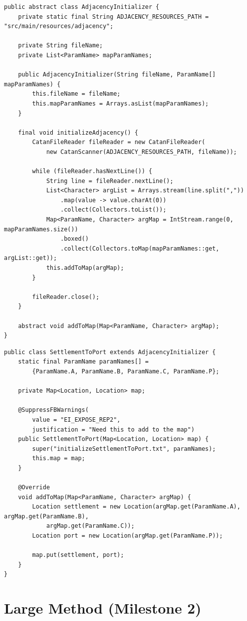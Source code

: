 \documentclass{fank1basedocument}
\begin{document}
\begin{lstlisting}[style=javacode,language=myJava]
public abstract class AdjacencyInitializer {
	private static final String ADJACENCY_RESOURCES_PATH = "src/main/resources/adjacency";

	private String fileName;
	private List<ParamName> mapParamNames;

	public AdjacencyInitializer(String fileName, ParamName[] mapParamNames) {
		this.fileName = fileName;
		this.mapParamNames = Arrays.asList(mapParamNames);
	}

	final void initializeAdjacency() {
		CatanFileReader fileReader = new CatanFileReader(
			new CatanScanner(ADJACENCY_RESOURCES_PATH, fileName));
		
		while (fileReader.hasNextLine()) {
			String line = fileReader.nextLine();
			List<Character> argList = Arrays.stream(line.split(","))
				.map(value -> value.charAt(0))
				.collect(Collectors.toList());
			Map<ParamName, Character> argMap = IntStream.range(0, mapParamNames.size())
				.boxed()
				.collect(Collectors.toMap(mapParamNames::get, argList::get));
			this.addToMap(argMap);
		}

		fileReader.close();
	}

	abstract void addToMap(Map<ParamName, Character> argMap);
}
\end{lstlisting}
\begin{lstlisting}[style=javacode,language=myJava]
public class SettlementToPort extends AdjacencyInitializer {
	static final ParamName paramNames[] =
		{ParamName.A, ParamName.B, ParamName.C, ParamName.P};

	private Map<Location, Location> map;

	@SuppressFBWarnings(
		value = "EI_EXPOSE_REP2",
		justification = "Need this to add to the map")
	public SettlementToPort(Map<Location, Location> map) {
		super("initializeSettlementToPort.txt", paramNames);
		this.map = map;
	}

	@Override
	void addToMap(Map<ParamName, Character> argMap) {
		Location settlement = new Location(argMap.get(ParamName.A), argMap.get(ParamName.B),
			argMap.get(ParamName.C));
		Location port = new Location(argMap.get(ParamName.P));

		map.put(settlement, port);
	}
}
\end{lstlisting}

\section*{Large Method (Milestone 2)}
\end{document}
